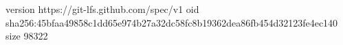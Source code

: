 version https://git-lfs.github.com/spec/v1
oid sha256:45bfaa49858c1dd65e974b27a32dc58fc8b19362dea86fb454d32123fe4ec140
size 98322
